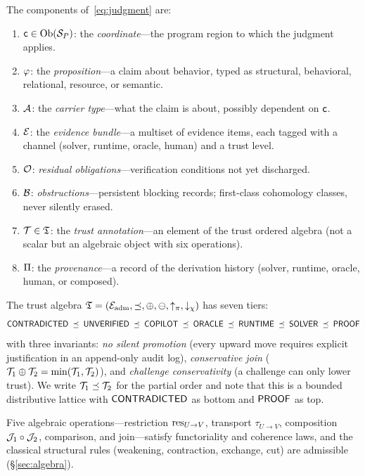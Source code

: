 \begin{definition}\label{def:judgment-intro}
The components of~\eqref{eq:judgment} are:
\begin{enumerate}[label=(\roman*),itemsep=1pt]
  \item $\mathsf{c} \in \mathrm{Ob}(\mathcal{S}_P)$: the \emph{coordinate}---the program
        region to which the judgment applies.
  \item $\varphi$: the \emph{proposition}---a claim about behavior, typed as
        structural, behavioral, relational, resource, or semantic.
  \item $\mathcal{A}$: the \emph{carrier type}---what the claim is about,
        possibly dependent on $\mathsf{c}$.
  \item $\mathcal{E}$: the \emph{evidence bundle}---a multiset of evidence items,
        each tagged with a channel (solver, runtime, oracle, human) and a
        trust level.
  \item $\mathcal{O}$: \emph{residual obligations}---verification conditions not
        yet discharged.
  \item $\mathcal{B}$: \emph{obstructions}---persistent blocking records;
        first-class cohomology classes, never silently erased.
  \item $\mathcal{T} \in \mathfrak{T}$: the \emph{trust annotation}---an element of
        the trust ordered algebra (not a scalar but an algebraic object
        with six operations).
  \item $\Pi$: the \emph{provenance}---a record of the derivation
        history (solver, runtime, oracle, human, or composed).
\end{enumerate}
\end{definition}

The trust algebra $\mathfrak{T} = (\mathcal{E}_{\mathrm{adm}}, \preceq, \oplus, \ominus, \uparrow_\pi,
\downarrow_\chi)$ has seven tiers:
\[
  \mathsf{CONTRADICTED} \;\preceq\; \mathsf{UNVERIFIED} \;\preceq\; \mathsf{COPILOT} \;\preceq\;
  \mathsf{ORACLE} \;\preceq\; \mathsf{RUNTIME} \;\preceq\; \mathsf{SOLVER} \;\preceq\; \mathsf{PROOF}
\]
with three invariants: \emph{no silent promotion} (every upward move
requires explicit justification in an append-only audit log),
\emph{conservative join} ($\mathcal{T}_1 \oplus \mathcal{T}_2 = \min(\mathcal{T}_1,
\mathcal{T}_2)$), and \emph{challenge conservativity} (a challenge can only
lower trust).  We write $\mathcal{T}_1 \preceq \mathcal{T}_2$ for the partial order
and note that this is a bounded distributive lattice with $\mathsf{CONTRADICTED}$ as
bottom and $\mathsf{PROOF}$ as top.

Five algebraic operations---restriction $\mathrm{res}_{U \to V}$, transport
$\tau_{U \to V}$, composition $\mathcal{J}_1 \circ \mathcal{J}_2$, comparison, and
join---satisfy functoriality and coherence laws, and the classical
structural rules (weakening, contraction, exchange, cut) are admissible
(\S\ref{sec:algebra}).

